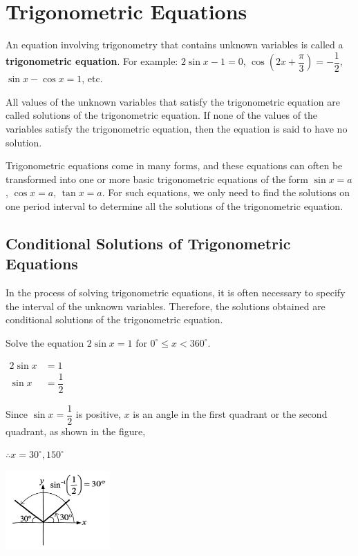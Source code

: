 \documentclass{report}
\begin{document}
\newpage
\section{Trigonometric Equations}

An equation involving trigonometry that contains unknown variables is called a \textbf{trigonometric equation}. For example: $2 \sin x-1=0$, $\cos \left(2 x+\dfrac{\pi}{3}\right)=-\dfrac{1}{2}$, $\sin x-\cos x=1$, etc.

All values of the unknown variables that satisfy the trigonometric equation are called solutions of the trigonometric equation. If none of the values of the variables satisfy the trigonometric equation, then the equation is said to have no solution.

Trigonometric equations come in many forms, and these equations can often be transformed into one or more basic trigonometric equations of the form $\sin x=a$, $\cos x=a$, $\tan x=a$. For such equations, we only need to find the solutions on one period interval to determine all the solutions of the trigonometric equation.

\subsection*{Conditional Solutions of Trigonometric Equations}

In the process of solving trigonometric equations, it is often necessary to specify the interval of the unknown variables. Therefore, the solutions obtained are conditional solutions of the trigonometric equation.

\begin{question}
	Solve the equation $2\sin x=1$ for $0^{\circ}\leq x<360^{\circ}$.
	
	\sol{}
	
	\begin{vwcol}[widths={0.6,0.4}, sep=0.8cm, justify=flush,rule=0pt]
		\noindent $\begin{aligned} 2\sin x & =1 \\ \sin x & =\dfrac{1}{2}\end{aligned}$
		
		\noindent Since $\sin x=\dfrac{1}{2}$ is positive, $x$ is an angle in the first quadrant or the second quadrant, as shown in the figure,
		
		\noindent $\therefore x=30^{\circ}, 150^{\circ}$
		
		\includegraphics[width=0.3\textwidth]{assets/11-7.jpg}
	\end{vwcol}
\end{question}
\end{document}
